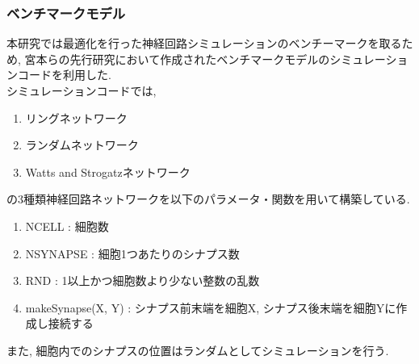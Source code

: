 \subsubsection{ベンチマークモデル}
本研究では最適化を行った神経回路シミュレーションのベンチーマークを取るため,
宮本らの先行研究\cite{miyamoto-master}において作成されたベンチマークモデルのシミュレーションコードを利用した.\\
シミュレーションコードでは,
\begin{enumerate}
\item リングネットワーク
\item ランダムネットワーク
\item Watts and Strogatzネットワーク
\end{enumerate}
の3種類神経回路ネットワークを以下のパラメータ・関数を用いて構築している.\\

\begin{enumerate}
\item NCELL : 細胞数
\item NSYNAPSE : 細胞1つあたりのシナプス数
\item RND : 1以上かつ細胞数より少ない整数の乱数
\item makeSynapse(X, Y) : シナプス前末端を細胞X, シナプス後末端を細胞Yに作成し接続する
\end{enumerate}
また, 細胞内でのシナプスの位置はランダムとしてシミュレーションを行う.\\
